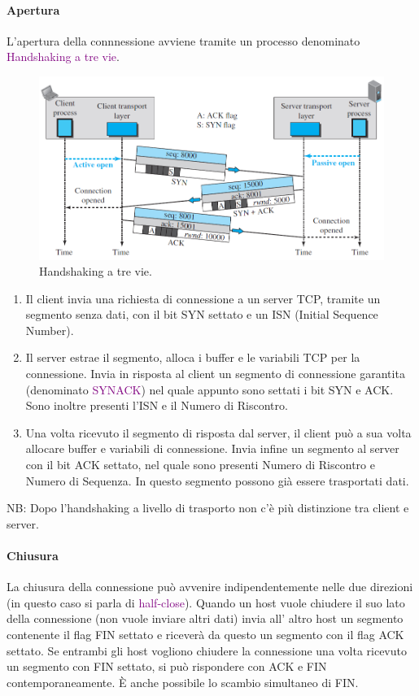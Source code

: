 \paragraph{Apertura} L'apertura della connnessione avviene tramite un processo denominato \textcolor{purple}{Handshaking a tre vie}.
\begin{figure}[h]
    \centering
    \includegraphics[scale=0.37]{Immagini/HandShakingTreVieTCP.png}
    \caption{Handshaking a tre vie.}
\end{figure}
\begin{enumerate}
    \item Il client invia una richiesta di connessione a un server TCP, tramite un segmento senza dati, con il bit SYN settato e un ISN (Initial Sequence Number).
    \item Il server estrae il segmento, alloca i buffer e le variabili TCP per la connessione.
    Invia in risposta al client un segmento di connessione garantita (denominato \textcolor{purple}{SYNACK}) nel quale appunto sono settati i bit SYN e ACK. Sono inoltre presenti l'ISN e il Numero di Riscontro. 
    \item Una volta ricevuto il segmento di risposta dal server, il client può a sua volta allocare buffer e variabili di connessione. Invia infine un segmento al server con il bit ACK settato, nel quale sono presenti Numero di Riscontro e Numero di Sequenza. In questo segmento possono già essere trasportati dati.
\end{enumerate}

NB: Dopo l'handshaking a livello di trasporto non c'è più distinzione tra client e server.

\paragraph{Chiusura} La chiusura della connessione può avvenire indipendentemente nelle due direzioni (in questo caso si parla di \textcolor{purple}{half-close}). Quando un host vuole chiudere il suo lato della connessione (non vuole inviare altri dati) invia all' altro host un segmento contenente il flag FIN settato e riceverà da questo un segmento con il flag ACK settato.
Se entrambi gli host vogliono chiudere la connessione una volta ricevuto un segmento con FIN settato, si può rispondere con ACK e FIN contemporaneamente. È anche possibile lo scambio simultaneo di FIN.

